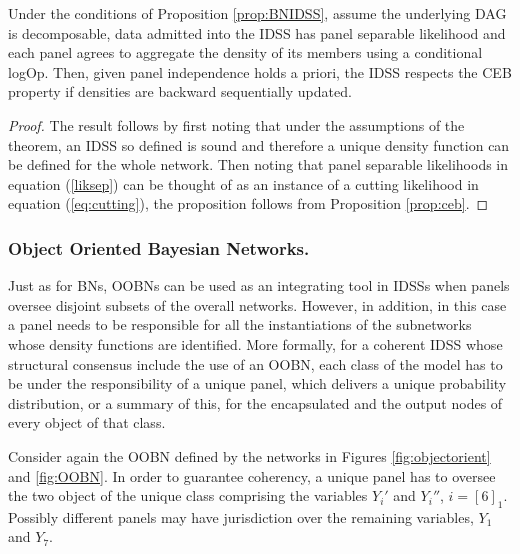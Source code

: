 \begin{proposition}
\label{prop:combi}
Under the conditions of Proposition \ref{prop:BNIDSS}, assume the underlying DAG is decomposable, data admitted into the IDSS has panel separable likelihood and each panel agrees to aggregate the density of its members using a conditional logOp. Then, given panel independence holds a priori, the IDSS respects the CEB property if densities are backward sequentially updated. 
\end{proposition}
\begin{proof}
The result follows by first noting that under the assumptions of the theorem, an IDSS so defined is sound and therefore a unique density function can be defined for the whole network. Then noting that panel separable likelihoods in equation (\ref{liksep}) can be thought of as an instance of a cutting likelihood in equation (\ref{eq:cutting}), the proposition follows from Proposition \ref{prop:ceb}.
\end{proof}


\subsubsection{Object Oriented Bayesian Networks.}
Just as for BNs, OOBNs can be used as an integrating tool in IDSSs when panels oversee disjoint subsets of the overall networks. However, in addition, in this case a panel needs to be responsible for all the instantiations of the subnetworks whose density functions are identified. More formally, for a coherent IDSS whose structural consensus include the use of an OOBN, each class of the model has to be under the responsibility of a unique panel, which delivers a unique probability distribution, or a summary of this, for the encapsulated and the output nodes of every object of that class. 

\begin{example}
Consider again the OOBN defined by the networks in Figures \ref{fig:objectorient} and \ref{fig:OOBN}. In order to guarantee coherency, a unique panel has to oversee the two object of the unique class comprising the variables $Y_i'$ and $Y_i''$, $i=[6]_1$. Possibly different panels may have jurisdiction over the remaining variables, $Y_1$ and $Y_7$.
\end{example} 


